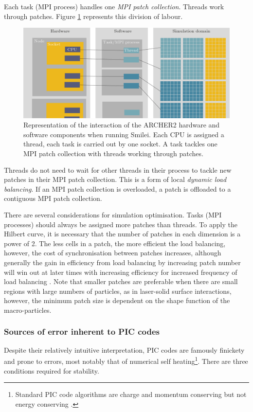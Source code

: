 Each task (MPI process) handles one \textit{MPI patch collection}. Threads work through patches. Figure \ref{fig:introsmileiparallelisationcomplex} represents this division of labour.
\begin{figure}
	\centering
	\includegraphics[width=1\linewidth]{figures/intro/intro_smilei_parallelisation_complex}
	\caption[Representation of the interaction of the ARCHER2 hardware and software components when running Smilei.]{Representation of the interaction of the ARCHER2 hardware and software components when running Smilei. Each CPU is assigned a thread, each task is carried out by one socket. A task tackles one MPI patch collection with threads working through patches.}
	\label{fig:introsmileiparallelisationcomplex}
\end{figure}
Threads do not need to wait for other threads in their process to tackle new patches in their MPI patch collection. This is a form of local \textit{dynamic load balancing}. If an MPI patch collection is overloaded, a patch is offloaded to a contiguous MPI patch collection.

There are several considerations for simulation optimisation. Tasks (MPI processes) should always be assigned more patches than threads. To apply the Hilbert curve, it is necessary that the number of patches in each dimension is a power of 2. The less cells in a patch, the more efficient the load balancing, however, the cost of synchronisation between patches increases, although generally the gain in efficiency from load balancing by increasing patch number will win out at later times with increasing efficiency for increased frequency of load balancing \cite{derouillatSmileiCollaborativeOpensource2018}. Note that smaller patches are preferable when there are small regions with large numbers of particles, as in laser-solid surface interactions, however, the minimum patch size is dependent on the shape function of the macro-particles.

\subsubsection{Sources of error inherent to PIC codes}
Despite their relatively intuitive interpretation, PIC codes are famously finickety and prone to errors, most notably that of numerical self heating\footnote{Standard PIC code algorithms are charge and momentum conserving but not energy conserving \cite{derouillatSmileiCollaborativeOpensource2018}.}. There are three conditions required for stability.


